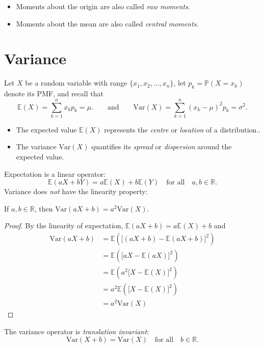 \documentclass[lecture]{csm}
\newcommand{\R}{\mathbb{R}}
\newcommand{\prob}{\mathbb{P}}
\newcommand{\expe}{\mathbb{E}}
\newcommand{\var}{\text{Var}}
\def\it{\item}
\def\bit{\begin{itemize}}
\def\eit{\end{itemize}}
\begin{document}
\begin{remark}
\bit
\it Moments about the origin are also called \emph{raw moments}. 
\it Moments about the mean are also called \emph{central moments}. 
\eit
\end{remark}

\section{Variance}
Let $X$ be a random variable with range $\{x_1,x_2,\ldots,x_n\}$, let $p_k = \prob(X=x_k)$ denote its PMF, and recall that
\[
\expe(X) = \sum_{k=1}^{n}x_k p_k = \mu.
\qquad\text{and}\qquad 
\var(X) = \sum_{k=1}^{n}(x_k-\mu)^2 p_k = \sigma^2.
\]

\bit
\it The expected value $\expe(X)$ represents the \emph{centre} or \emph{location} of a distribution..
\it The variance $\var(X)$ quantifies its \emph{spread} or \emph{dispersion} around the expected value.
\eit

Expectation is a linear operator: 
\[
\expe(aX+bY) = a\expe(X) + b\expe(Y)\quad\text{for all}\quad a,b\in\R.
\]
Variance does \emph{not} have the linearity property:

\begin{theorem}\label{thm:properties_of_variance}
If $a,b\in\R$, then $\var(aX+b) = a^2\var(X)$.
\end{theorem}
\begin{proof}
By the linearity of expectation, $\expe(aX+b)=a\expe(X)+b$ and
\begin{align*}
\var(aX+b)	& = \expe\left(\big[(aX+b) - \expe(aX+b)\big]^2\right) \\
			& = \expe\left(\big[aX - \expe(aX)\big]^2\right) \\
			& = \expe\left(a^2\big[X - \expe(X)\big]^2\right) \\
			& = a^2\expe\left(\big[X - \expe(X)\big]^2\right) \\
			& = a^2\var(X)
\end{align*}
\end{proof}

\begin{remark}
The variance operator is \emph{translation invariant}: 
\[
\var(X+b)=\var(X)\quad\text{for all}\quad b\in\R.
\]
\end{remark}
\end{document}
